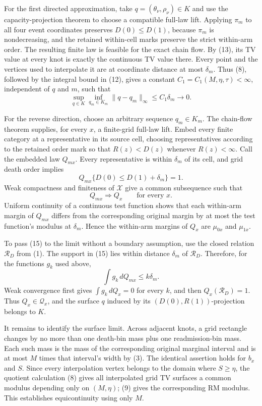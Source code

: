 For the first directed approximation, take \(q=(\theta_\nu,\rho_\nu)\in K\) and use the capacity-projection theorem to choose a compatible full-law lift.  Applying \(\pi_m\) to all four event coordinates preserves \(D(0)\leq D(1)\), because \(\pi_m\) is nondecreasing, and the retained within-cell marks preserve the strict within-arm order.  The resulting finite law is feasible for the exact chain flow.  By (13), its TV value at every knot is exactly the continuous TV value there.  Every point and the vertices used to interpolate it are at coordinate distance at most \(\delta_m\).  Thus (8), followed by the integral bound in (12), gives a constant \(C_1=C_1(M,\eta,\tau)<\infty\), independent of \(q\) and \(m\), such that
\[
 \sup_{q\in K}\inf_{q_m\in K_m}
 \|q-q_m\|_\infty
 \leq C_1\delta_m\longrightarrow0. \tag{14}
\]

For the reverse direction, choose an arbitrary sequence \(q_m\in K_m\).  The chain-flow theorem supplies, for every \(x\), a finite-grid full-law lift.  Embed every finite category at a representative in its source cell, choosing representatives according to the retained order mark so that \(R(z)<D(z)\) whenever \(R(z)<\infty\).  Call the embedded law \(Q_{mx}\).  Every representative is within \(\delta_m\) of its cell, and grid death order implies
\[
 Q_{mx}\{D(0)\leq D(1)+\delta_m\}=1. \tag{15}
\]
Weak compactness and finiteness of \(\mathcal X\) give a common subsequence such that
\[
 Q_{mx}\Rightarrow Q_x\qquad\text{for every }x. \tag{16}
\]
Uniform continuity of a continuous test function shows that each within-arm margin of \(Q_{mx}\) differs from the corresponding original margin by at most the test function's modulus at \(\delta_m\).  Hence the within-arm margins of \(Q_x\) are \(\mu_{0x}\) and \(\mu_{1x}\).

To pass (15) to the limit without a boundary assumption, use the closed relation \(\mathcal R_D\) from (1).  The support in (15) lies within distance \(\delta_m\) of \(\mathcal R_D\).  Therefore, for the functions \(g_k\) used above,
\[
 \int g_k\,dQ_{mx}\leq k\delta_m.
\]
Weak convergence first gives \(\int g_k\,dQ_x=0\) for every \(k\), and then \(Q_x(\mathcal R_D)=1\).  Thus \(Q_x\in\mathcal Q_x\), and the surface \(q\) induced by its \((D(0),R(1))\)-projection belongs to \(K\).

It remains to identify the surface limit.  Across adjacent knots, a grid rectangle changes by no more than one death-bin mass plus one readmission-bin mass.  Each such mass is the mass of the corresponding original marginal interval and is at most \(M\) times that interval's width by (3).  The identical assertion holds for \(b_x\) and \(S\).  Since every interpolation vertex belongs to the domain where \(S\geq\eta\), the quotient calculation (8) gives all interpolated grid TV surfaces a common modulus depending only on \((M,\eta)\); (9) gives the corresponding RM modulus.  This establishes equicontinuity using only \(M\).

